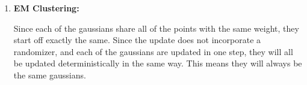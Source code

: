 \documentclass[12pt]{article}
\begin{document}
\begin{enumerate}
\item \textbf{EM Clustering:}

Since each of the gaussians share all of the points with the same weight, they start off exactly the same. Since the update does not incorporate a randomizer, and each of the gaussians are updated in one step, they will all be updated deterministically in the same way. This means they will always be the same gaussians.

\end{enumerate}
\end{document}
